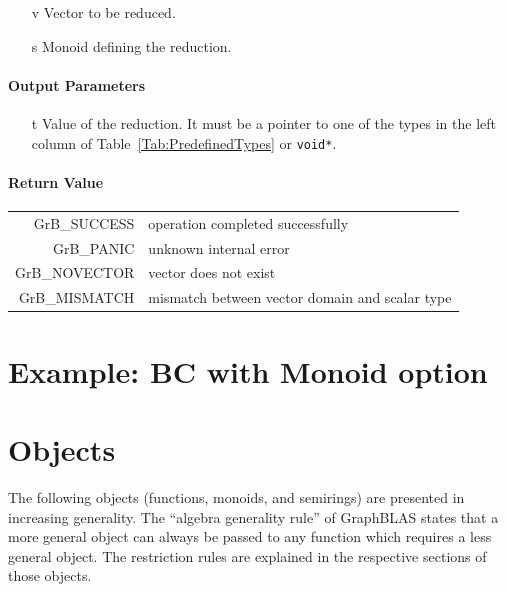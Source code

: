 \documentclass[11pt]{extarticle}
\begin{document}
{\begin{itemize}
	\item[{\sf v}] Vector to be reduced.
	\item[{\sf s}] Monoid defining the reduction.
\end{itemize}

\paragraph{Output Parameters}

\begin{itemize}
	\item[{\sf t}] Value of the reduction. It must
	be a pointer to one of the types in 
	the left column of Table~\ref{Tab:PredefinedTypes} or
	{\tt void*}.
\end{itemize}

\paragraph{Return Value}

\begin{tabular}{rl}
{\sf GrB\_SUCCESS}	& operation completed successfully \\
{\sf GrB\_PANIC}	& unknown internal error \\
{\sf GrB\_NOVECTOR}	& vector does not exist \\
{\sf GrB\_MISMATCH}	& mismatch between vector domain and scalar type \\
\end{tabular}

\pagebreak
\nolinenumbers
\section{Example: BC with Monoid option}
{\scriptsize

}
}

\pagebreak
\section{Objects}

The following objects (functions, monoids, and semirings) are presented in increasing generality.
The ``algebra generality rule'' of GraphBLAS states that a more general object can always be passed to
any function which requires a less general object. The restriction rules are explained in the respective sections of those objects.
\end{document}
